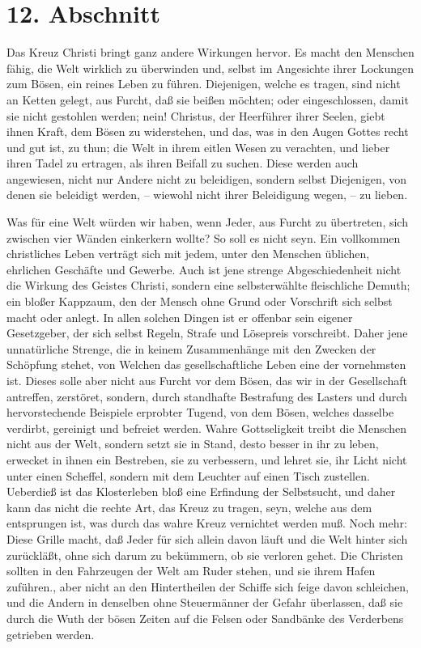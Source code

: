 \section{12. Abschnitt} \label{kap5_ab12}

Das Kreuz Christi bringt ganz andere Wirkungen hervor. Es macht den Menschen
fähig, die Welt wirklich zu überwinden und, selbst im Angesichte ihrer Lockungen
zum Bösen, ein reines Leben zu führen. Diejenigen, welche es tragen, sind nicht
an Ketten gelegt, aus Furcht, daß sie beißen möchten; oder eingeschlossen, damit
sie nicht gestohlen werden; nein! Christus, der Heerführer ihrer Seelen, giebt
ihnen Kraft, dem Bösen zu widerstehen, und das, was in den Augen Gottes recht
und gut ist, zu thun; die Welt in ihrem eitlen Wesen zu verachten, und lieber
ihren Tadel zu ertragen, als ihren Beifall zu suchen. Diese werden auch
angewiesen, nicht nur Andere nicht zu beleidigen, sondern selbst Diejenigen, von
denen sie beleidigt werden, -- wiewohl nicht ihrer Beleidigung wegen, -- zu
lieben.

\medskip

Was für eine Welt würden wir haben, wenn Jeder, aus Furcht zu übertreten, sich
zwischen vier Wänden einkerkern wollte? So soll es nicht seyn. Ein vollkommen
christliches Leben verträgt sich mit jedem, unter den Menschen üblichen,
ehrlichen Geschäfte und Gewerbe. Auch ist jene strenge Abgeschiedenheit nicht
die Wirkung des Geistes Christi, sondern eine selbsterwählte fleischliche
Demuth; ein bloßer Kappzaum, den der Mensch ohne Grund oder Vorschrift sich
selbst macht oder anlegt. In allen solchen Dingen ist er offenbar sein eigener
Gesetzgeber, der sich selbst Regeln, Strafe und Lösepreis vorschreibt. Daher
jene unnatürliche Strenge, die in keinem Zusammenhänge mit den Zwecken der
Schöpfung stehet, von Welchen das gesellschaftliche Leben eine der vornehmsten
ist. Dieses solle aber nicht aus Furcht vor dem Bösen, das wir in der
Gesellschaft antreffen, zerstöret, sondern, durch standhafte Bestrafung des
Lasters und durch hervorstechende Beispiele erprobter Tugend, von dem Bösen,
welches dasselbe verdirbt, gereinigt und befreiet werden. Wahre Gottseligkeit
treibt die Menschen nicht aus der Welt, sondern setzt sie in Stand, desto besser
in ihr zu leben, erwecket in ihnen ein Bestreben, sie zu verbessern, und lehret
sie, ihr Licht nicht unter einen Scheffel, sondern mit dem Leuchter auf einen
Tisch zustellen. Ueberdieß ist das Klosterleben bloß eine Erfindung der
Selbstsucht, und daher kann das nicht die rechte Art, das Kreuz zu tragen, seyn,
welche aus dem entsprungen ist, was durch das wahre Kreuz vernichtet werden muß.
Noch mehr: Diese Grille macht, daß Jeder für sich allein davon läuft und die
Welt hinter sich zurückläßt, ohne sich darum zu bekümmern, ob sie verloren
gehet. Die Christen sollten in den Fahrzeugen der Welt am Ruder stehen, und sie
ihrem Hafen zuführen., aber nicht an den Hintertheilen der Schiffe sich feige
davon schleichen, und die Andern in denselben ohne Steuermänner der Gefahr
überlassen, daß sie durch die Wuth der bösen Zeiten auf die Felsen oder
Sandbänke des Verderbens getrieben werden.

